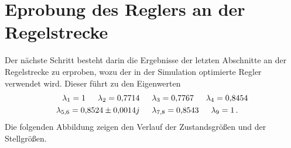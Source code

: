 \section{Eprobung des Reglers an der Regelstrecke}
Der nächste Schritt besteht darin die Ergebnisse der letzten Abschnitte an der Regelstrecke zu erproben, wozu der in der Simulation optimierte Regler verwendet wird. Dieser führt zu den Eigenwerten
\begin{equation}
\begin{split}
\lambda_{\text{1}} = 1 \hspace{15pt} \lambda_{\text{2}} = 0{,}7714 \hspace{15pt} &\lambda_{\text{3}} = 0{,}7767 \hspace{15pt} \lambda_{\text{4}} = 0{,}8454
\\
\lambda_{\text{5,6}} = 0{,}8524\pm0{,}0014j \hspace{15pt} &\lambda_{\text{7,8}} = 0{,}8543 \hspace{15pt} \lambda_{\text{9}} = 1 \,.
\end{split}
\label{eq_ew1_corner}
\end{equation}
Die folgenden Abbildung zeigen den Verlauf der Zustandsgrößen und der Stellgrößen.
